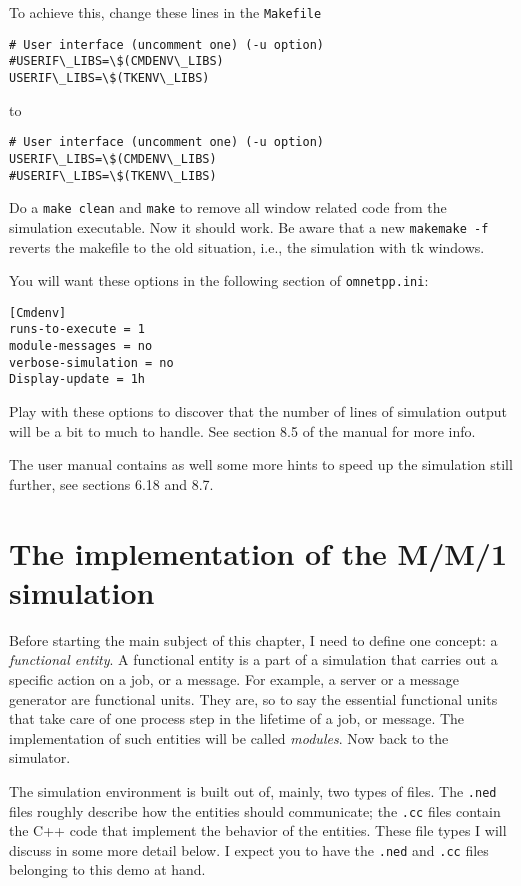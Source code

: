 \documentclass[a4paper]{article}
\begin{document}
To achieve this, change these lines in the  \texttt{Makefile}

\begin{verbatim}
# User interface (uncomment one) (-u option) 
#USERIF\_LIBS=\$(CMDENV\_LIBS) 
USERIF\_LIBS=\$(TKENV\_LIBS) 
\end{verbatim}

to 

\begin{verbatim}
# User interface (uncomment one) (-u option) 
USERIF\_LIBS=\$(CMDENV\_LIBS) 
#USERIF\_LIBS=\$(TKENV\_LIBS) 
\end{verbatim}

Do a \texttt{make clean} and \texttt{make} to remove all window
related code from the simulation executable. Now it should work. Be
aware that a new \texttt{makemake -f} reverts the makefile to the old
situation, i.e., the simulation with tk windows. 

You will want these options in the following section of
\texttt{omnetpp.ini}:
\begin{verbatim}
[Cmdenv]
runs-to-execute = 1
module-messages = no
verbose-simulation = no
Display-update = 1h
\end{verbatim}
Play with these options to discover that the number of lines of
simulation output will be a bit to much to handle. See section 8.5 of
the manual for more info. 

The user manual contains as well some more hints to speed up the
simulation still further, see sections 6.18 and  8.7. 

\section{The implementation of the M/M/1 simulation}
\label{sec:impl-fifo-simul}
Before starting the main subject of this chapter, I need to define one
concept: a \emph{functional entity}. A functional entity is a part of 
a simulation that carries out a specific action on a job, or a
message. For example, a server or a message generator are functional
units. They are, so to say the essential functional units that take
care of one process step in the lifetime of a job, or message. The
implementation of such entities will be called \emph{modules}. Now
back to the simulator.

The simulation environment is built out of, mainly, two types of
files.  The \texttt{.ned} files roughly describe how the entities
should communicate; the \texttt{.cc} files contain the C++ code that
implement the behavior of the entities. These file types I will
discuss in some more detail below. I expect you to have the
\texttt{.ned} and \texttt{.cc} files belonging to this demo at hand. 
\end{document}
